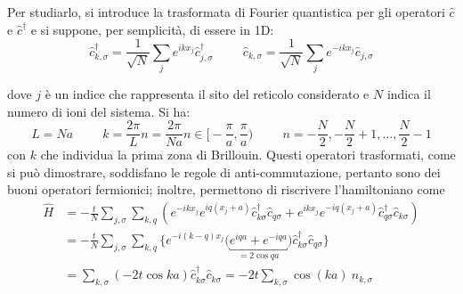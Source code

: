 \documentclass[11pt, a4paper]{scrartcl}
\theoremstyle{style}
\theoremstyle{style1}
\numberwithin{equation}{subsection}
\begin{document}
Per studiarlo, si introduce la trasformata di Fourier quantistica per gli operatori $\hat{c}$ e $\hat{c}^\dagger $ e si suppone, per semplicit\`a, di essere in 1D:
\[
\hat{c}^\dagger _{k,\sigma }  = \frac{1}{\sqrt{N} }\sum_{j}^{} e^{ik x_j}\hat{c}_{j,\sigma } ^\dagger \hspace{1cm} \hat{c} _{k,\sigma }  = \frac{1}{\sqrt{N} }\sum_{j}^{} e^{-ik x_j}\hat{c}_{j,\sigma }  
\] 
\begin{center}
\end{center}
dove $j$ \`e un indice che rappresenta il sito del reticolo considerato e $N$ indica il numero di ioni del sistema.
Si ha:
\[
 L=N a\hspace{1cm}k = \frac{2\pi}{L}n=\frac{2\pi}{Na} n \in \bigg[-\frac{\pi}{a}, \frac{\pi}{a}\bigg)\hspace{1cm} n = -\frac{N}{2}, - \frac{N}{2}+1 ,\ldots, \frac{N}{2}-1
\] 
con $k$ che individua la prima zona di Brillouin.
Questi operatori trasformati, come si pu\`o dimostrare, soddisfano le regole di anti-commutazione, pertanto sono dei buoni operatori fermionici; inoltre, permettono di riscrivere l'hamiltoniano come
\[
	\begin{split}
		\hat{H} &= -\frac{t}{N} \sum_{j,\sigma }^{} \sum_{k,q}^{}  \left(e^{-i kx _j}e^{i q (x_j + a)} \hat{c}^\dagger _{k\sigma } \hat{c}_{q\sigma } +e^{i kx _j}e^{-i q (x_j + a)} \hat{c}^\dagger _{q\sigma } \hat{c}_{k\sigma }\right) \\
			&= - \frac{t}{N} \sum_{j,\sigma }^{} \sum_{k,q}^{} \bigg\{ e^{-i (k-q)x_j} \big(\underbracket{e^{iqa}+ e^{-iqa}}_{=2\cos qa} \big) \hat{c}^\dagger _{k\sigma } \hat{c}_{q\sigma }  \bigg\} \\
			&= \sum_{k,\sigma }^{} (-2t \cos ka) \hat{c}^\dagger _{k\sigma } \hat{c}_{k\sigma } =-2t \sum_{k,\sigma }^{} \cos (ka) \ \hat{n}_{k,\sigma } 
	\end{split}
\] 
\end{document}
